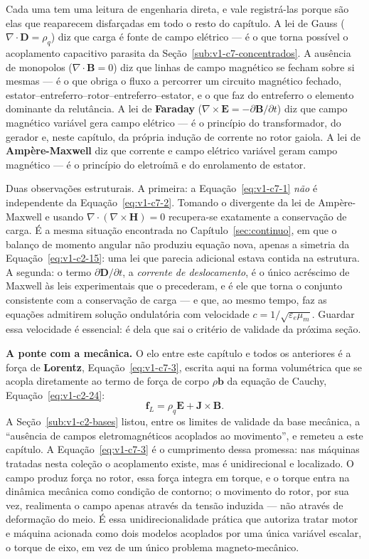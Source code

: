 \documentclass[12pt,a4paper]{article}
\numberwithin{equation}{section}
\numberwithin{table}{section}
\numberwithin{figure}{section}
\begin{document}
Cada uma tem uma leitura de engenharia direta, e vale registrá-las porque são
elas que reaparecem disfarçadas em todo o resto do capítulo. A lei de Gauss
($\nabla\cdot\mathbf{D} = \rho_q$) diz que carga é fonte de campo elétrico ---
é o que torna possível o acoplamento capacitivo parasita da
Seção~\ref{sub:v1-c7-concentrados}. A ausência de monopolos
($\nabla\cdot\mathbf{B} = 0$) diz que linhas de campo magnético se fecham sobre
si mesmas --- é o que obriga o fluxo a percorrer um circuito magnético fechado,
estator--entreferro--rotor--entreferro--estator, e o que faz do entreferro o
elemento dominante da relutância. A lei de \textbf{Faraday}
($\nabla\times\mathbf{E} = -\partial\mathbf{B}/\partial t$) diz que campo
magnético variável gera campo elétrico --- é o princípio do transformador, do
gerador e, neste capítulo, da própria indução de corrente no rotor gaiola. A lei
de \textbf{Ampère-Maxwell} diz que corrente e campo elétrico variável geram
campo magnético --- é o princípio do eletroímã e do enrolamento de estator.

Duas observações estruturais. A primeira: a Equação~\eqref{eq:v1-c7-1}
\emph{não} é independente da Equação~\eqref{eq:v1-c7-2}. Tomando o divergente
da lei de Ampère-Maxwell e usando $\nabla\cdot(\nabla\times\mathbf{H})=0$
recupera-se exatamente a conservação de carga. É a mesma situação encontrada no
Capítulo~\ref{sec:continuo}, em que o balanço de momento angular não produziu
equação nova, apenas a simetria da Equação~\eqref{eq:v1-c2-15}: uma lei que
parecia adicional estava contida na estrutura. A segunda: o termo
$\partial\mathbf{D}/\partial t$, a \emph{corrente de deslocamento}, é o único
acréscimo de Maxwell às leis experimentais que o precederam, e é ele que torna
o conjunto consistente com a conservação de carga --- e que, ao mesmo tempo,
faz as equações admitirem solução ondulatória com velocidade
$c = 1/\sqrt{\varepsilon_e\mu_m}$. Guardar essa velocidade é essencial: é dela
que sai o critério de validade da próxima seção.

\textbf{A ponte com a mecânica.} O elo entre este capítulo e todos os
anteriores é a força de \textbf{Lorentz}, Equação~\eqref{eq:v1-c7-3}, escrita
aqui na forma volumétrica que se acopla diretamente ao termo de força de corpo
$\rho\mathbf{b}$ da equação de Cauchy, Equação~\eqref{eq:v1-c2-24}:
\begin{equation}\label{eq:v1-c7-3}
\mathbf{f}_{L} = \rho_q\mathbf{E} + \mathbf{J}\times\mathbf{B} .
\end{equation}
A Seção~\ref{sub:v1-c2-bases} listou, entre os limites de validade da base
mecânica, a ``ausência de campos eletromagnéticos acoplados ao movimento'', e
remeteu a este capítulo. A Equação~\eqref{eq:v1-c7-3} é o cumprimento dessa
promessa: nas máquinas tratadas nesta coleção o acoplamento existe, mas é
unidirecional e localizado. O campo produz força no rotor, essa força integra
em torque, e o torque entra na dinâmica mecânica como condição de contorno; o
movimento do rotor, por sua vez, realimenta o campo apenas através da tensão
induzida --- não através de deformação do meio. É essa unidirecionalidade
prática que autoriza tratar motor e máquina acionada como dois modelos
acoplados por uma única variável escalar, o torque de eixo, em vez de um único
problema magneto-mecânico.
\end{document}
